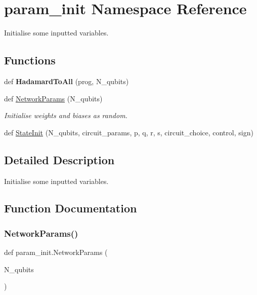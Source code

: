 \hypertarget{namespaceparam__init}{}\section{param\+\_\+init Namespace Reference}
\label{namespaceparam__init}


Initialise some inputted variables.  


\subsection*{Functions}
\begin{DoxyCompactItemize}
\item 
\mbox{\label{namespaceparam__init_ae5d012046ff4c4b02b4884ad0290085e}} 
def {\bfseries Hadamard\+To\+All} (prog, N\+\_\+qubits)
\item 
def \hyperlink{namespaceparam__init_a9b7e7fa5125f008e290db23538a75fcd}{Network\+Params} (N\+\_\+qubits)
\begin{DoxyCompactList}\small\item\em Initialise weights and biases as random. \end{DoxyCompactList}\item 
def \hyperlink{namespaceparam__init_acaba8c3dc08d2083e7277f86f4ff232c}{State\+Init} (N\+\_\+qubits, circuit\+\_\+params, p, q, r, s, circuit\+\_\+choice, control, sign)
\end{DoxyCompactItemize}


\subsection{Detailed Description}
Initialise some inputted variables. 

\subsection{Function Documentation}
\mbox{\label{namespaceparam__init_a9b7e7fa5125f008e290db23538a75fcd}} 
\subsubsection{\texorpdfstring{Network\+Params()}{NetworkParams()}}
{\footnotesize\ttfamily def param\+\_\+init.\+Network\+Params (\begin{DoxyParamCaption}\item[{}]{N\+\_\+qubits }\end{DoxyParamCaption})}



